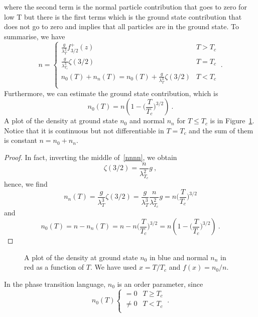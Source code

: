     where the second term is the normal particle contribution that goes to zero for low T but there is the first terms which is the ground state contribution that does not go to zero and implies that all particles are in the ground state. To summarise, we have 
    \begin{equation}\label{nnnn}
        n = \begin{cases}
            \frac{g}{\lambda_T^3} f^+_{3/2} (z) & T > T_c \\
            \frac{g}{\lambda_{T_c}^3} \zeta(3/2) & T = T_c \\
            n_0(T) + n_n(T) = n_0 (T) + \frac{g}{\lambda_{T}^3} \zeta(3/2) & T < T_c \\
        \end{cases} ~.
    \end{equation}
    Furthermore, we can estimate the ground state contribution, which is 
    \begin{equation*}
        n_0 (T) = n (1 - \Big (\frac{T}{T_c} \Big)^{3/2}) ~.
    \end{equation*} 
    A plot of the density at ground state $n_0$ and normal $n_n$ for $T \leq T_c$ is in Figure~\ref{fig:nn}. Notice that it is continuous but not differentiable in $T = T_c$ and the sum of them is constant $n = n_0 + n_n$.
    \begin{proof}
        In fact, inverting the middle of~\eqref{nnnn}, we obtain 
        \begin{equation*}
            \zeta(3/2) = \frac{n}{\lambda_{T_c}^2}{g} ~,
        \end{equation*}
        hence, we find 
        \begin{equation*}
            n_n (T) = \frac{g}{\lambda_T^3} \zeta(3/2) = \frac{g}{\lambda_T^3} \frac{n}{\lambda_{T_c}^2}{g} = n \Big (\frac{T}{T_c} \Big)^{3/2} 
        \end{equation*}
        and 
        \begin{equation*}
            n_0 (T) = n - n_n(T) = n - n \Big (\frac{T}{T_c} \Big)^{3/2} = n (1 - \Big (\frac{T}{T_c} \Big)^{3/2}) ~.
        \end{equation*}
    \end{proof}
    \begin{figure}
        \centering
        \caption{A plot of the density at ground state $n_0$ in blue and normal $n_n$ in red as a function of $T$. We have used $x = T / T_c$ and $f(x) = n_0 / n$.}
        \label{fig:nn}
    \end{figure}
    In the phase transition language, $n_0$ is an order parameter, since 
    \begin{equation*}
        n_0 (T) \begin{cases}
            = 0 & T \geq T_c \\
            \neq 0 & T < T_c \\
        \end{cases} ~.
    \end{equation*}

